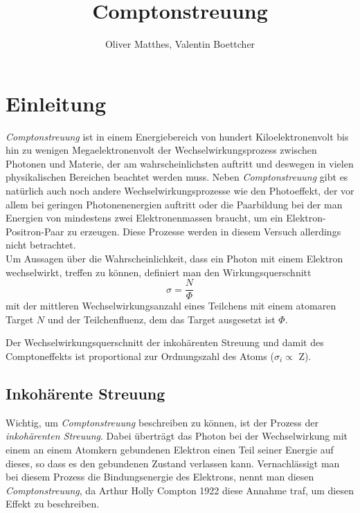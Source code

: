 \documentclass[slug=CS, room=Andreas-Schubert-Bau\,\ Labor\ 406,
supervisor=Juliane\ Volkmer, coursedate=29.\ 11.\ 2019]{../../Lab_Report_LaTeX/lab_report}
\title{Comptonstreuung}
\author{Oliver Matthes, Valentin Boettcher}
\newcommand{\cs}{\emph{Comptonstreuung}}
\begin{document}
\maketitle

\section{Einleitung}
\label{sec:einl}

\cs{} ist in einem Energiebereich von hundert Kiloelektronenvolt bis hin zu wenigen
Megaelektronenvolt der Wechselwirkungsprozess zwischen Photonen und Materie, der am
 wahrscheinlichsten auftritt und deswegen in vielen physikalischen Bereichen beachtet werden muss.
Neben \cs{} gibt es natürlich auch noch andere Wechselwirkungsprozesse wie den
Photoeffekt, der vor allem bei geringen Photonenenergien auftritt oder die Paarbildung bei
der man Energien von mindestens zwei Elektronenmassen braucht, um ein Elektron-Positron-Paar
zu erzeugen. Diese Prozesse werden in diesem Versuch allerdings nicht betrachtet.\\

Um Aussagen über die Wahrscheinlichkeit, dass ein Photon mit einem Elektron wechselwirkt,
treffen zu können, definiert man den Wirkungsquerschnitt
\begin{equation}\label{eq:wirkquer}
        \sigma = \frac{N}{\Phi}
\end{equation}
mit der mittleren Wechselwirkungsanzahl eines Teilchens mit einem
atomaren Target \(N\) und der Teilchenfluenz, dem das Target
ausgesetzt ist \(\Phi\).

Der Wechselwirkungsquerschnitt der inkohärenten Streuung und damit des Comptoneffekts ist
proportional zur Ordnungszahl des Atoms (\(\sigma_i \propto\) Z).\cite[2]{iktp19}\\

\subsection{Inkohärente Streuung}
\label{sec:inkostreu}

Wichtig, um \cs{} beschreiben zu können, ist der Prozess der \emph{inkohärenten Streuung}.
Dabei überträgt das Photon bei der Wechselwirkung mit einem an einem Atomkern gebundenen
Elektron einen Teil seiner Energie auf dieses, so dass es den gebundenen Zustand verlassen kann.
Vernachlässigt man bei diesem Prozess die Bindungsenergie des Elektrons, nennt man diesen \cs{},
da Arthur Holly Compton 1922 diese Annahme traf, um diesen Effekt zu beschreiben.~\cite[3]{iktp19}\\
\end{document}
